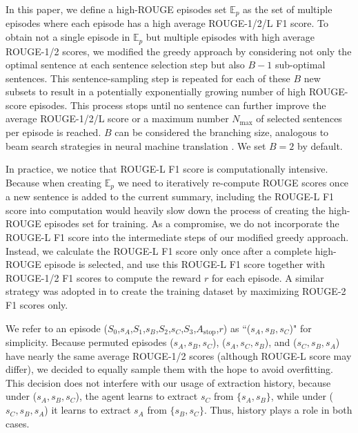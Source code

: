 \documentclass[11pt]{article}
\begin{document}
In this paper, we define a high-ROUGE episodes set $\mathbb{E}_p$ as the set of multiple episodes where each episode has a high average ROUGE-1/2/L F1 score. To obtain not a single episode in $\mathbb{E}_p$ but multiple episodes with high average ROUGE-1/2 scores, we modified the greedy approach by considering not only the optimal sentence at each sentence selection step but also $B-1$ sub-optimal sentences. This sentence-sampling step is repeated for each of these $B$ new subsets to result in a potentially exponentially growing number of high ROUGE-score episodes. This process stops until no sentence can further improve the average ROUGE-1/2/L score or a maximum number $N_\text{max}$ of selected sentences per episode is reached. $B$ can be considered the branching size, analogous to beam search strategies in neural machine translation \cite{sutskever2014sequence,freitag2017beam}. We set $B=2$ by default.

In practice, we notice that ROUGE-L F1 score is computationally intensive. Because when creating $\mathbb{E}_p$ we need to iteratively re-compute ROUGE scores once a new sentence is added to the current summary, including the ROUGE-L F1 score into computation would heavily slow down the process of creating the high-ROUGE episodes set for training. 
As a compromise, we do not incorporate the ROUGE-L F1 score into the intermediate steps of our modified greedy approach. Instead, we calculate the ROUGE-L F1 score only once after a complete high-ROUGE episode is selected, and use this ROUGE-L F1 score together with ROUGE-1/2 F1 scores to compute the reward $r$ for each episode. A similar strategy was adopted in \citet{zhou-etal-2018-neural-document} to create the training dataset by maximizing ROUGE-2 F1 scores only. 


We refer to an episode  ($S_0$,$s_{A}$,$S_{1}$,$s_{B}$,$S_{2}$,$s_{C}$,$S_{3}$,$A_{\text{stop}}$,$r$) as ``($s_A,s_B,s_C$)" for simplicity. Because permuted episodes ($s_A,s_B,s_C$), ($s_A,s_C,s_B$), and ($s_C,s_B,s_A$) have nearly the same average ROUGE-1/2 scores (although ROUGE-L score may differ), we decided to equally sample them with the hope to avoid overfitting. This decision does not interfere with our usage of extraction history, because under ($s_A,s_B,s_C$), the agent learns to extract $s_C$ from $\{s_A,s_B\}$, while under ($s_C,s_B,s_A$) it learns to extract $s_A$ from $\{s_B,s_C\}$. Thus, history plays a role in both cases.
\end{document}
